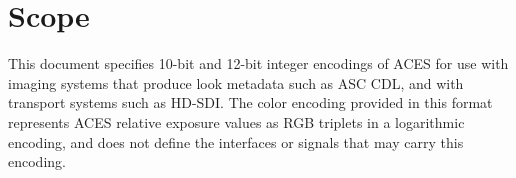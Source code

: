 \cleardoublepage
\numberedformat	
\chapter{Scope} 	%

This document specifies 10-bit and 12-bit integer encodings of ACES for use with imaging systems that produce look metadata such as ASC CDL, and with transport systems such as HD-SDI. The color encoding provided in this format represents ACES relative exposure values as RGB triplets in a logarithmic encoding, and does not define the interfaces or signals that may carry this encoding.